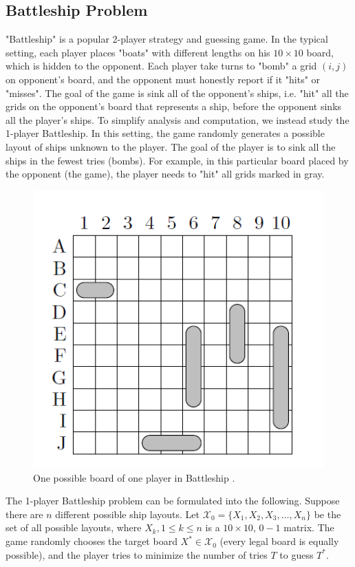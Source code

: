 \subsection{Battleship Problem}
"Battleship" is a popular 2-player strategy and guessing game. In the typical setting, each player places "boats" with different lengths on his $10\times 10$ board, which is hidden to the opponent. Each player take turns to "bomb" a grid $(i,j)$ on opponent's board, and the opponent must honestly report if it "hits" or "misses". The goal of the game is sink all of the opponent's ships, i.e. "hit" all the grids on the opponent's board that represents a ship, before the opponent sinks all the player's ships. 
To simplify analysis and computation, we instead study the 1-player Battleship. In this setting, the game randomly generates a possible layout of ships unknown to the player. The goal of the player is to sink all the ships in the fewest tries (bombs). 
For example, in this particular board placed by the opponent (the game), the player needs to "hit" all grids marked in gray.
\begin{figure}[H]\label{battleshipgame}
    \centering
    \includegraphics[scale=0.8]{figure/battleshipgame.png}
    \caption{One possible board of one player in Battleship
    \cite{battleshipoptimal}.}
\end{figure}

The 1-player Battleship problem can be formulated into the following. Suppose there are $n$ different possible ship layouts. Let $\mathcal{X}_0 = \{ X_1, X_2, X_3, \dots, X_n \}$ be the set of all possible layouts, where $X_k, 1\leq k \leq n$ is a $10\times 10$, $0-1$ matrix. The game randomly chooses the target board $X^{*} \in \mathcal{X}_0$ (every legal board is equally possible), and the player tries to minimize the number of tries $T$ to guess $T^{*}$.

